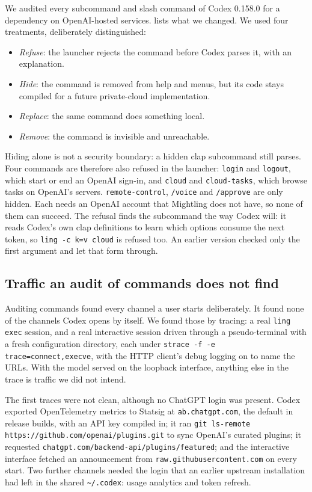 \documentclass[11pt]{article}
\newcommand{\code}[1]{\texttt{#1}}
\begin{document}
We audited every subcommand and slash command of Codex 0.158.0 for a dependency on OpenAI-hosted
services.  lists what we changed. We used four treatments, deliberately
distinguished:
\begin{itemize}
  \item \emph{Refuse}: the launcher rejects the command before Codex parses it, with an explanation.
  \item \emph{Hide}: the command is removed from help and menus, but its code stays compiled for a
    future private-cloud implementation.
  \item \emph{Replace}: the same command does something local.
  \item \emph{Remove}: the command is invisible and unreachable.
\end{itemize}
Hiding alone is not a security boundary: a hidden clap subcommand still parses. Four commands are
therefore also refused in the launcher: \code{login} and \code{logout}, which start or end an
OpenAI sign-in, and \code{cloud} and \code{cloud-tasks}, which browse tasks on OpenAI's servers.
\code{remote-control}, \code{/voice} and \code{/approve} are only hidden. Each needs an OpenAI
account that Mightling does not have, so none of them can succeed.
The refusal finds the subcommand the way Codex will: it reads Codex's own clap definitions to learn
which options consume the next token, so \code{ling -c k=v cloud} is refused too. An earlier
version checked only the first argument and let that form through.

\subsection{Traffic an audit of commands does not find}
\label{sec:egress}

Auditing commands found every channel a user starts deliberately. It found none of the channels
Codex opens by itself. We found those by tracing: a real \code{ling exec} session, and a real
interactive session driven through a pseudo-terminal with a fresh configuration directory, each
under \code{strace -f -e trace=connect,execve}, with the HTTP client's debug logging on to name the
URLs. With the model served on the loopback interface, anything else in the trace is traffic we
did not intend.

The first traces were not clean, although no ChatGPT login was present. Codex exported OpenTelemetry
metrics to Statsig at \code{ab.chatgpt.com}, the default in release builds, with an API key compiled
in; it ran \code{git ls-remote https://github.com/openai/plugins.git} to sync OpenAI's curated
plugins; it requested \code{chatgpt.com/backend-api/plugins/featured}; and the interactive
interface fetched an announcement from \code{raw.githubusercontent.com} on every start. Two further
channels needed the login that an earlier upstream installation had left in the shared
\code{\textasciitilde/.codex}: usage analytics and token refresh.
\end{document}
